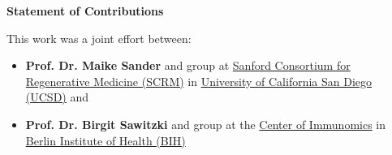 \begin{Comment2}
\vspace{5mm}
\label{contr:chapter2}
\hspace{-3mm}
\textbf{Statement of Contributions} \\
\par This work was a joint effort between:
\begin{itemize}
  \item \textbf{Prof. Dr. Maike Sander} and group at \href{https://www.sanfordconsortium.org/}{Sanford Consortium for Regenerative Medicine (SCRM)} in \href{https://ucsd.edu/}{University of California San Diego (UCSD)} and
  \item  \textbf{Prof. Dr. Birgit Sawitzki} and group at the \href{https://www.bihealth.org/de/forschung/sektionen/exploratory-diagnostic-sciences-eds/center-of-immunomics}{Center of Immunomics} in \href{https://www.bihealth.org/}{Berlin Institute of Health (BIH)}
\end{itemize}


\end{Comment2}
